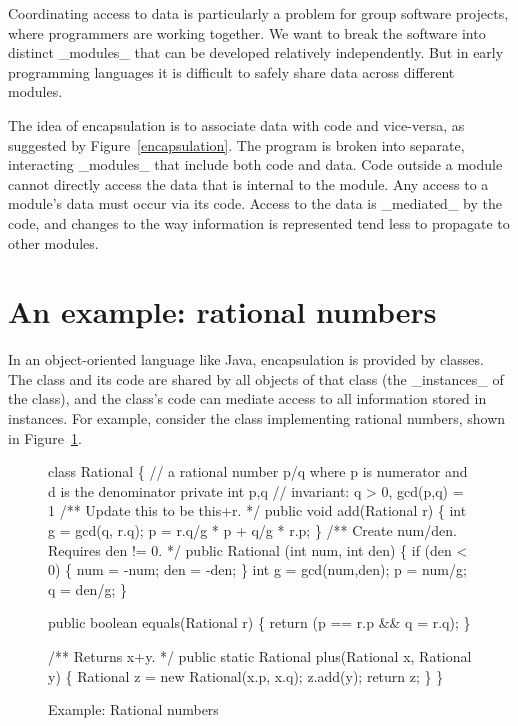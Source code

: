 \documentclass{article}
\begin{document}
Coordinating access to data is particularly a problem for group
software projects, where programmers are working together. We want to
break the software into distinct _modules_ that can be developed
relatively independently. But in early programming languages it is
difficult to safely share data across different modules.

The idea of encapsulation is to associate data with code and
vice-versa, as suggested by Figure~\ref{encapsulation}. The program
is broken into separate, interacting _modules_ that include both code
and data. Code outside a module cannot directly access the data that
is internal to the module. Any access to a module's data must occur
via its code. Access to the data is _mediated_ by the code, and
changes to the way information is represented tend less to propagate
to other modules.

\section{An example: rational numbers}

In an object-oriented language like Java, encapsulation is provided by
classes. The class and its code are shared by all objects of that
class (the _instances_ of the class), and the class's code can mediate
access to all information stored in instances. For example, consider
the class implementing rational numbers, shown in
Figure~\ref{rational-code}.

\begin{figure}
\begin{code}
\small
class Rational \{ // a rational number p/q where p is numerator and d is the denominator
  private int p,q
    // invariant: q > 0, gcd(p,q) = 1
\hbox{}
  /** Update this to be this+r. */
  public void add(Rational r) \{
    int g = gcd(q, r.q);
    p = r.q/g * p + q/g * r.p;
  \}
\hbox{}
  /** Create num/den. Requires den != 0. */
  public Rational (int num, int den) \{
    if (den < 0) \{
      num = -num;
      den = -den;
    \}
    int g = gcd(num,den);
    p = num/g;
    q = den/g;
  \}

  public boolean equals(Rational r) \{
    return (p == r.p && q = r.q);
  \}

  /** Returns x+y. */
  public static Rational plus(Rational x, Rational y) \{
    Rational z = new Rational(x.p, x.q);
    z.add(y);
    return z;
  \}
\}
\end{code}
\caption{Example: Rational numbers}
\label{rational-code}
\end{figure}
\end{document}
